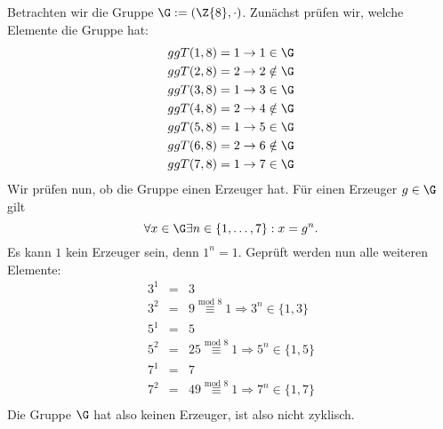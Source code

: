 \begin{beispiel}
\label{bsp:azyklische_gruppe}
Betrachten wir die Gruppe $\G := (\Z{8}, \cdot)$. Zunächst prüfen wir, welche
Elemente die Gruppe hat:
\begin{eqnarray*}
ggT(1, 8) = 1 \rightarrow 1 \in \G\\
ggT(2, 8) = 2 \rightarrow 2 \notin \G\\
ggT(3, 8) = 1 \rightarrow 3 \in \G\\
ggT(4, 8) = 2 \rightarrow 4 \notin \G\\
ggT(5, 8) = 1 \rightarrow 5 \in \G\\
ggT(6, 8) = 2 \rightarrow 6 \notin \G\\
ggT(7, 8) = 1 \rightarrow 7 \in \G\\
\end{eqnarray*}
Wir prüfen nun, ob die Gruppe einen Erzeuger hat. Für einen Erzeuger
$g \in \G$ gilt 
\[
\forall x \in \G \exists n\in\{1,\dots, 7\}: x = g^n.
\]
Es kann $1$ kein Erzeuger sein, denn $1^n=1$. Geprüft werden nun alle
weiteren Elemente:
\begin{eqnarray*}
  3^1 & = & 3\\
  3^2 & = & 9 \stackrel{\text{mod 8}}{\equiv} 1 \Rightarrow 3^n\in\{1, 3\}\\
  5^1 & = & 5\\
  5^2 & = & 25 \stackrel{\text{mod 8}}{\equiv} 1 \Rightarrow 5^n\in\{1, 5\}\\
  7^1 & = & 7\\
  7^2 & = & 49 \stackrel{\text{mod 8}}{\equiv} 1 \Rightarrow 7^n\in\{1, 7\}\\
\end{eqnarray*}
Die Gruppe $\G$ hat also keinen Erzeuger, ist also nicht zyklisch.
\end{beispiel}

